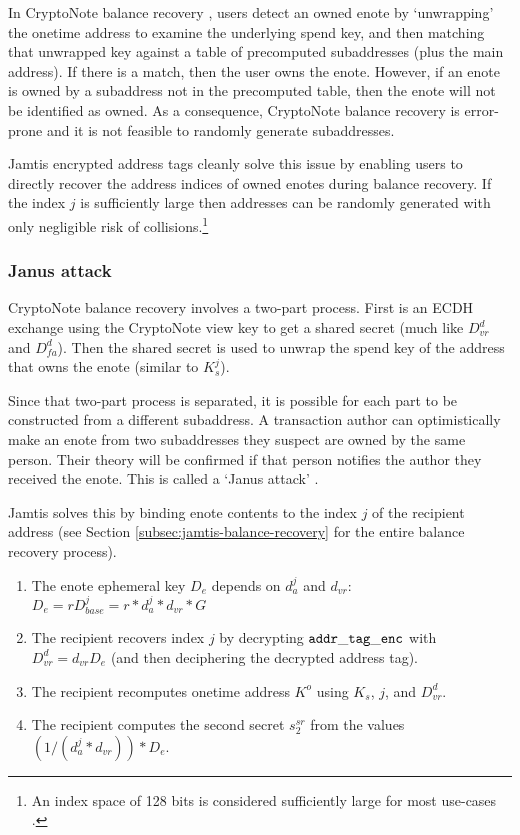 In CryptoNote balance recovery \cite{cryptoNoteWhitePaper, ztm-2}, users detect an owned enote by `unwrapping' the onetime address to examine the underlying spend key, and then matching that unwrapped key against a table of precomputed subaddresses (plus the main address). If there is a match, then the user owns the enote. However, if an enote is owned by a subaddress not in the precomputed table, then the enote will not be identified as owned. As a consequence, CryptoNote balance recovery is error-prone and it is not feasible to randomly generate subaddresses.

Jamtis encrypted address tags cleanly solve this issue by enabling users to directly recover the address indices of owned enotes during balance recovery. If the index $j$ is sufficiently large then addresses can be randomly generated with only negligible risk of collisions.\footnote{An index space of 128 bits is considered sufficiently large for most use-cases \cite{uuid-rfc4122}.}

\subsubsection{Janus attack}
\label{subsubsec:jamtis-cryptonote-flaws-janus}

CryptoNote balance recovery involves a two-part process. First is an ECDH exchange using the CryptoNote view key to get a shared secret (much like $D^d_{vr}$ and $D^d_{fa}$). Then the shared secret is used to unwrap the spend key of the address that owns the enote (similar to $K^j_s$).

Since that two-part process is separated, it is possible for each part to be constructed from a different subaddress. A transaction author can optimistically make an enote from two subaddresses they suspect are owned by the same person. Their theory will be confirmed if that person notifies the author they received the enote. This is called a `Janus attack' \cite{janus-attack}.

Jamtis solves this by binding enote contents to the index $j$ of the recipient address (see Section \ref{subsec:jamtis-balance-recovery} for the entire balance recovery process).
\begin{enumerate}
    \item The enote ephemeral key $D_e$ depends on $d^j_a$ and $d_{vr}$: $D_e = r D^j_{base} = r * d^j_a * d_{vr} * G$

    \item The recipient recovers index $j$ by decrypting ${\tt addr\_tag\_enc}$ with $D^d_{vr} = d_{vr} D_e$ (and then deciphering the decrypted address tag).

    \item The recipient recomputes onetime address $K^o$ using $K_s$, $j$, and $D^d_{vr}$.

    \item The recipient computes the second secret $s^{sr}_2$ from the values $(1/(d^j_a * d_{vr})) * D_e$.
\end{enumerate}

